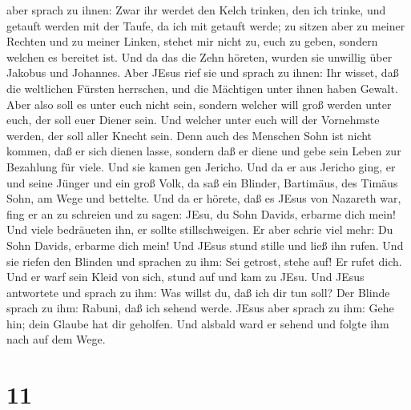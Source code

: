 aber sprach zu ihnen: Zwar ihr werdet den Kelch trinken, den ich trinke,
und getauft werden mit der Taufe, da ich mit getauft werde;
 zu sitzen aber zu meiner Rechten und zu meiner Linken,
stehet mir nicht zu, euch zu geben, sondern welchen es bereitet ist.
 Und da das die Zehn höreten, wurden sie unwillig über
Jakobus und Johannes.  Aber JEsus rief sie und sprach zu
ihnen: Ihr wisset, daß die weltlichen Fürsten herrschen, und die
Mächtigen unter ihnen haben Gewalt.  Aber also soll es
unter euch nicht sein, sondern welcher will groß werden unter euch, der
soll euer Diener sein.  Und welcher unter euch will der
Vornehmste werden, der soll aller Knecht sein.  Denn auch
des Menschen Sohn ist nicht kommen, daß er sich dienen lasse, sondern
daß er diene und gebe sein Leben zur Bezahlung für viele. 
Und sie kamen gen Jericho. Und da er aus Jericho ging, er und seine
Jünger und ein groß Volk, da saß ein Blinder, Bartimäus, des Timäus
Sohn, am Wege und bettelte.  Und da er hörete, daß es JEsus
von Nazareth war, fing er an zu schreien und zu sagen: JEsu, du Sohn
Davids, erbarme dich mein!  Und viele bedräueten ihn, er
sollte stillschweigen. Er aber schrie viel mehr: Du Sohn Davids, erbarme
dich mein!  Und JEsus stund stille und ließ ihn rufen. Und
sie riefen den Blinden und sprachen zu ihm: Sei getrost, stehe auf! Er
rufet dich.  Und er warf sein Kleid von sich, stund auf und
kam zu JEsu.  Und JEsus antwortete und sprach zu ihm: Was
willst du, daß ich dir tun soll? Der Blinde sprach zu ihm: Rabuni, daß
ich sehend werde.  JEsus aber sprach zu ihm: Gehe hin; dein
Glaube hat dir geholfen. Und alsbald ward er sehend und folgte ihm nach
auf dem Wege.

\hypertarget{section-10}{%
\section{11}\label{section-10}}

